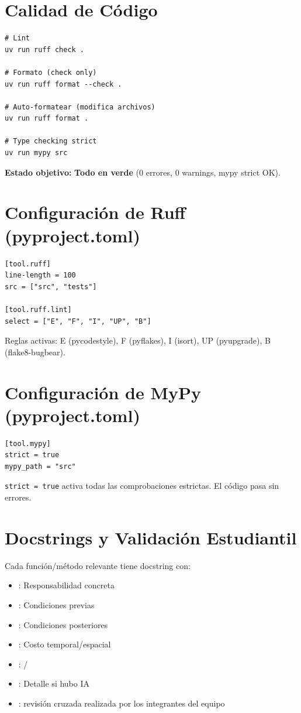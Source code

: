 \section{Calidad de Código}
\label{sec:calidad-codigo}

\begin{verbatim}
# Lint
uv run ruff check .

# Formato (check only)
uv run ruff format --check .

# Auto-formatear (modifica archivos)
uv run ruff format .

# Type checking strict
uv run mypy src
\end{verbatim}

\textbf{Estado objetivo:} \textbf{Todo en verde} (0 errores, 0 warnings, mypy strict OK).

\section{Configuración de Ruff (pyproject.toml)}
\label{sec:ruff-config}

\begin{verbatim}
[tool.ruff]
line-length = 100
src = ["src", "tests"]

[tool.ruff.lint]
select = ["E", "F", "I", "UP", "B"]
\end{verbatim}

Reglas activas: E (pycodestyle), F (pyflakes), I (isort), UP (pyupgrade), B (flake8-bugbear).

\section{Configuración de MyPy (pyproject.toml)}
\label{sec:mypy-config}

\begin{verbatim}
[tool.mypy]
strict = true
mypy_path = "src"
\end{verbatim}

\texttt{strict = true} activa todas las comprobaciones estrictas. El código pasa sin errores.

\section{Docstrings y Validación Estudiantil}
\label{sec:docstrings}

Cada función/método relevante tiene docstring con:
\begin{itemize}
\item {}: Responsabilidad concreta
\item {}: Condiciones previas
\item {}: Condiciones posteriores
\item {}: Costo temporal/espacial
\item {}: /
\item {}: Detalle si hubo IA
\item {}: revisión cruzada realizada por los integrantes del equipo
\end{itemize}


